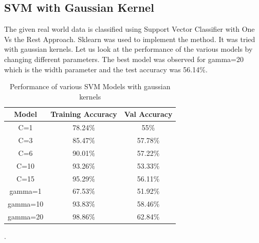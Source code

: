 \subsection{SVM with Gaussian Kernel}
The given real world data is classified using Support Vector Classifier with One Vs the Rest Approach. Sklearn was used to implement the method. It was tried with gaussian kernels. Let us look at the performance of the various models by changing different parameters. The best model was observed for gamma=20 which is the width parameter and the test accuracy was 56.14$\%$.



{
\begin{table}[!h]
\centering
\begin{tabular}{ |c|c|c|  }
\hline
\rowcolor{lightgray} Model & Training Accuracy & Val Accuracy\\
\hline
C=1 & 78.24$\%$  & 55$\%$  \\ 
\hline
C=3 & 85.47$\%$  & 57.78$\%$  \\ 
\hline
C=6 & 90.01$\%$  & 57.22$\%$  \\ 
\hline
C=10 & 93.26$\%$  & 53.33$\%$  \\ 
\hline
C=15 & 95.29$\%$  & 56.11$\%$  \\ 
\hline
gamma=1 & 67.53$\%$  & 51.92$\%$  \\ 
\hline
gamma=10 & 93.83$\%$  & 58.46$\%$  \\ 
\hline
gamma=20 & 98.86$\%$  & 62.84$\%$  \\ 
\hline
\end{tabular}
\caption{Performance of various SVM Models with gaussian kernels}.
\label{table:3}
\end{table}
}



